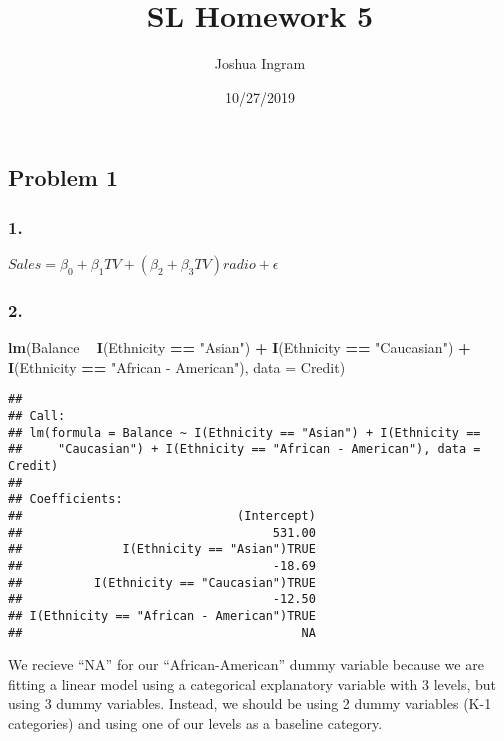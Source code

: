 \documentclass[]{article}
\title{SL Homework 5}
\author{Joshua Ingram}
\date{10/27/2019}
\newenvironment{Shaded}{\begin{snugshade}}{\end{snugshade}}
\newcommand{\DataTypeTok}[1]{\textcolor[rgb]{0.13,0.29,0.53}{#1}}
\newcommand{\KeywordTok}[1]{\textcolor[rgb]{0.13,0.29,0.53}{\textbf{#1}}}
\newcommand{\NormalTok}[1]{#1}
\newcommand{\OperatorTok}[1]{\textcolor[rgb]{0.81,0.36,0.00}{\textbf{#1}}}
\newcommand{\StringTok}[1]{\textcolor[rgb]{0.31,0.60,0.02}{#1}}
\begin{document}
\maketitle

\hypertarget{problem-1}{%
\subsection{Problem 1}\label{problem-1}}

\hypertarget{section}{%
\subsubsection{1.}\label{section}}

\(Sales = \beta_0 + \beta_1TV + (\beta_2 + \beta_3TV)radio + \epsilon\)

\hypertarget{section-1}{%
\subsubsection{2.}\label{section-1}}

\begin{Shaded}
\begin{Highlighting}[]
\KeywordTok{lm}\NormalTok{(Balance }\OperatorTok{~}\StringTok{ }\KeywordTok{I}\NormalTok{(Ethnicity }\OperatorTok{==}\StringTok{ "Asian"}\NormalTok{) }\OperatorTok{+}\StringTok{ }\KeywordTok{I}\NormalTok{(Ethnicity }\OperatorTok{==}\StringTok{ "Caucasian"}\NormalTok{) }\OperatorTok{+}\StringTok{ }\KeywordTok{I}\NormalTok{(Ethnicity }\OperatorTok{==}\StringTok{ "African - American"}\NormalTok{), }\DataTypeTok{data =}\NormalTok{ Credit)}
\end{Highlighting}
\end{Shaded}

\begin{verbatim}
## 
## Call:
## lm(formula = Balance ~ I(Ethnicity == "Asian") + I(Ethnicity == 
##     "Caucasian") + I(Ethnicity == "African - American"), data = Credit)
## 
## Coefficients:
##                              (Intercept)  
##                                   531.00  
##              I(Ethnicity == "Asian")TRUE  
##                                   -18.69  
##          I(Ethnicity == "Caucasian")TRUE  
##                                   -12.50  
## I(Ethnicity == "African - American")TRUE  
##                                       NA
\end{verbatim}

We recieve ``NA'' for our ``African-American'' dummy variable because we
are fitting a linear model using a categorical explanatory variable with
3 levels, but using 3 dummy variables. Instead, we should be using 2
dummy variables (K-1 categories) and using one of our levels as a
baseline category.
\end{document}
